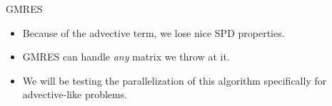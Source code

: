 \begin{frame}{GMRES}
  \begin{itemize}
    \item Because of the advective term, we lose nice SPD properties.
    \item GMRES can handle \emph{any} matrix we throw at it.
    \item We will be testing the parallelization of this algorithm specifically for advective-like problems.
  \end{itemize}
\end{frame}